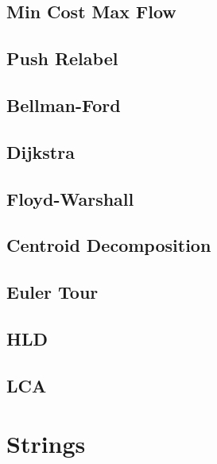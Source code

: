 \subsection{Min Cost Max Flow}
\raggedbottom
\hrulefill
\subsection{Push Relabel}
\raggedbottom
\hrulefill
\subsection{Bellman-Ford}
\raggedbottom
\hrulefill
\subsection{Dijkstra}
\raggedbottom
\hrulefill
\subsection{Floyd-Warshall}
\raggedbottom
\hrulefill
\subsection{Centroid Decomposition}
\raggedbottom
\hrulefill
\subsection{Euler Tour}
\raggedbottom
\hrulefill
\subsection{HLD}
\raggedbottom
\hrulefill
\subsection{LCA}
\raggedbottom
\hrulefill
\newpage

\section{Strings}
